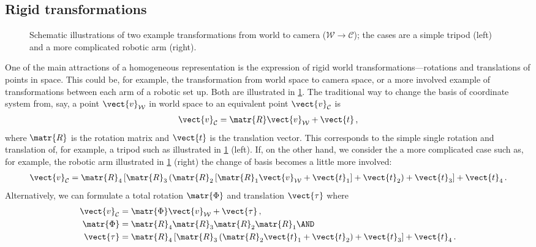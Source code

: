\documentclass[oneandhalfcolumn]{coursenotes-handout}
\begin{document}
\subsection{Rigid transformations}

\begin{figure}
  \centering
  \hfill
  
  \hfill
  
  \hfill
  \caption{Schematic illustrations of two example transformations from world to camera (\(\mathcal{W}\rightarrow\mathcal{C}\)); the cases are a simple tripod (left) and a more complicated robotic arm (right).%
  \label{fig:homocoords-rigidtransform}}%
\end{figure}

One of the main attractions of a homogeneous representation is the expression of rigid world transformations---rotations and translations of points in space. This could be, for example, the transformation from world space to camera space, or a more involved example of transformations between each arm of a robotic set up. Both are illustrated in \cref{fig:homocoords-rigidtransform}. The traditional way to change the basis of coordinate system from, say, a point \(\vect{v}_{\mathcal{W}}\) in world space to an equivalent point \(\vect{v}_{\mathcal{C}}\) is
\begin{align}
    \vect{v}_{\mathcal{C}} = \matr{R} \vect{v}_{\mathcal{W}} + \vect{t} \,, \label{eq:inhomo-rigidT-1step}
\end{align}
where \(\matr{R}\) is the rotation matrix and \(\vect{t}\) is the translation vector. This corresponds to the simple single rotation and translation of, for example, a tripod such as illustrated in \cref{fig:homocoords-rigidtransform} (left). If, on the other hand, we consider the a more complicated case such as, for example, the robotic arm illustrated in \cref{fig:homocoords-rigidtransform} (right) the change of basis becomes a little more involved:
\begin{align}
    \vect{v}_{\mathcal{C}} = \matr{R}_4 \left[\matr{R}_3 \left(\matr{R}_2 \left[\matr{R}_1 \vect{v}_{\mathcal{W}} + \vect{t}_1\right] + \vect{t}_2\right) + \vect{t}_3\right] + \vect{t}_4 \,. \label{eq:inhomo-rigidT-mstep-long}
\end{align}
Alternatively, we can formulate a total rotation \(\matr{\Phi}\) and translation \(\vect{\tau}\) where
\begin{align}
    \vect{v}_{\mathcal{C}} &= \matr{\Phi} \vect{v}_{\mathcal{W}} + \vect{\tau} \,, \\
    \matr{\Phi} &= \matr{R}_4 \matr{R}_3 \matr{R}_2 \matr{R}_1 \AND \\
    \vect{\tau} &= \matr{R}_4 \left[\matr{R}_3 \left(\matr{R}_2 \vect{t}_1 + \vect{t}_2\right) + \vect{t}_3\right] + \vect{t}_4\,. \label{eq:inhomo-rigidT-mstep}
\end{align}
\end{document}
